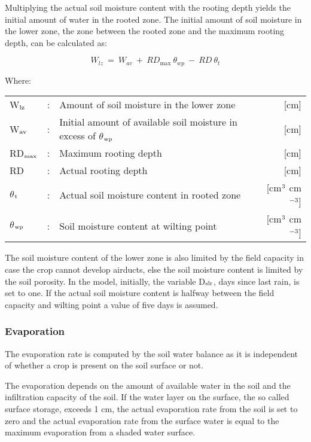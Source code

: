 Multiplying the actual soil moisture content with the rooting depth yields the initial
amount of water in the rooted zone. The initial amount of soil moisture in the lower zone,
the zone between the rooted zone and the maximum rooting depth, can be calculated as:

\begin{equation}
\label{eq:6.19}
W_{lz} ~ =~ W _{av} ~+~ RD_{\max } ~\theta_{wp} ~-~RD~\theta_{t} 
\end{equation}

Where:\\[5pt]
\begin{tabularx}{\textwidth}{llXr}
 W$_{{\rm lz}}$ &:& Amount of soil moisture in the lower zone & [cm]\\
 W$_{{\rm av}}$ &:& Initial amount of available soil moisture 
    in excess of $\theta$$_{{\rm wp}}$ & [cm]\\
 RD$_{{\rm max}}$ &:& Maximum rooting depth & [cm]\\
 RD &:& Actual rooting depth & [cm]\\
 $\theta$$_{{\rm t}}$ &:& Actual soil moisture content in rooted zone  
     & [cm$^{{\rm 3}}$ cm$^{{\rm -3}}$]\\
 $\theta$$_{{\rm wp}}$ &:& Soil moisture content at wilting point  
     & [cm$^{{\rm 3}}$ cm$^{{\rm -3}}$]\\
\end{tabularx}

The soil moisture content of the lower zone is also limited by the field capacity in case
the crop cannot develop airducts, else the soil moisture content is limited by the soil
porosity. In the model, initially, the variable D$_{{\rm slr}}$, days since last rain, is set 
to one. If the
actual soil moisture content is halfway between the field capacity and wilting point a
value of five days is assumed. 

\subsubsection{Evaporation}

The evaporation rate is computed by the soil water balance as it is independent of whether
a crop is present on the soil surface or not.

The evaporation depends on the amount of available water in the soil and the infiltration
capacity of the soil. If the water layer on the surface, the so called surface storage, 
exceeds 1 cm, the actual evaporation rate from the soil is set to zero and the actual
evaporation rate from the surface water is equal to the maximum evaporation from a
shaded water surface.


